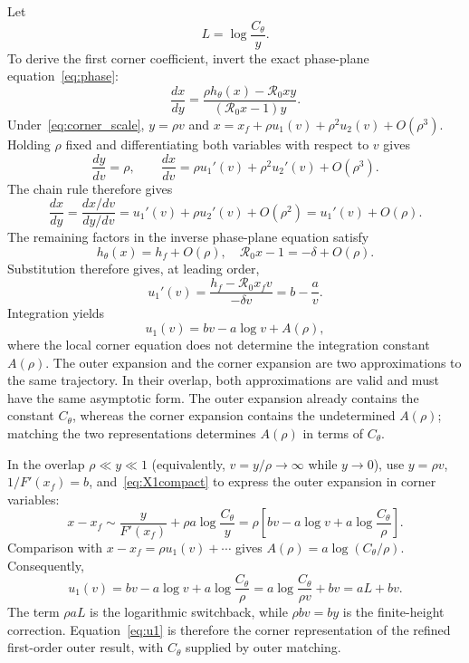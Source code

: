 \documentclass[11pt,a4paper]{article}
\newcommand{\Rzero}{\mathcal R_0}
\newcommand{\xf}{x_f}
\begin{document}
Let
\begin{equation}
\label{eq:L}
L=\log\frac{C_\theta}{y}.
\end{equation}
To derive the first corner coefficient, invert the exact phase-plane
equation~\eqref{eq:phase}:
\begin{equation}
\label{eq:inversephase}
\frac{dx}{dy}
=\frac{\rho h_\theta(x)-\Rzero xy}{(\Rzero x-1)y}.
\end{equation}
Under~\eqref{eq:corner_scale}, $y=\rho v$ and
$x=\xf+\rho u_1(v)+\rho^2u_2(v)+O(\rho^3)$. Holding $\rho$ fixed and
differentiating both variables with respect to $v$ gives
\[
\frac{dy}{dv}=\rho,
\qquad
\frac{dx}{dv}
=\rho u_1'(v)+\rho^2u_2'(v)+O(\rho^3).
\]
The chain rule therefore gives
\[
\frac{dx}{dy}
=\frac{dx/dv}{dy/dv}
=u_1'(v)+\rho u_2'(v)+O(\rho^2)
=u_1'(v)+O(\rho).
\]
The remaining factors in the inverse phase-plane equation satisfy
\[
 h_\theta(x)=h_f+O(\rho),
\quad \Rzero x-1=-\delta+O(\rho).
\]
Substitution therefore gives, at leading order,
\[
u_1'(v)
=\frac{h_f-\Rzero\xf v}{-\delta v}
=b-\frac{a}{v}.
\]
Integration yields
\[
u_1(v)=bv-a\log v+A(\rho),
\]
where the local corner equation does not determine the integration constant
$A(\rho)$. The outer expansion and the corner expansion are two approximations
to the same trajectory. In their overlap, both approximations are valid and
must have the same asymptotic form. The outer expansion already contains the
constant $C_\theta$, whereas the corner expansion contains the undetermined
$A(\rho)$; matching the two representations determines $A(\rho)$ in terms of
$C_\theta$.

In the overlap $\rho\ll y\ll1$ (equivalently, $v=y/\rho\to\infty$ while
$y\to0$), use $y=\rho v$, $1/F'(\xf)=b$, and~\eqref{eq:X1compact} to express
the outer expansion in corner variables:
\[
x-\xf
\sim\frac{y}{F'(\xf)}+\rho a\log\frac{C_\theta}{y}
=\rho\left[bv-a\log v+a\log\frac{C_\theta}{\rho}\right].
\]
Comparison with $x-\xf=\rho u_1(v)+\cdots$ gives
$A(\rho)=a\log(C_\theta/\rho)$. Consequently,
\begin{equation}
\label{eq:u1}
u_1(v)=bv-a\log v+a\log\frac{C_\theta}{\rho}
=a\log\frac{C_\theta}{\rho v}+bv
=aL+bv.
\end{equation}
The term $\rho aL$ is the logarithmic switchback, while
$\rho bv=by$ is the finite-height correction. Equation~\eqref{eq:u1} is
therefore the corner representation of the refined first-order outer result,
with $C_\theta$ supplied by outer matching.
\end{document}
